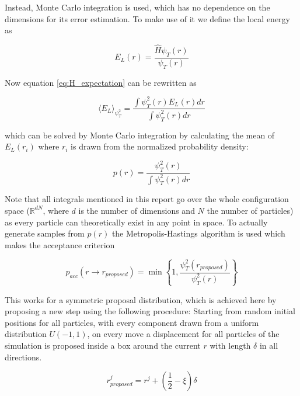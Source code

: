 \documentclass[a4paper, 11pt]{article}          %
\begin{document}
    Instead, Monte Carlo integration is used, which has no dependence on the dimensions for its error estimation. To make use of it we define the local energy as

    \begin{equation}\label{eq:local_energy}
        E_L(r) = \frac{\hat{H}\psi_T(r)}{\psi_T(r)}
    \end{equation}

    Now equation \eqref{eq:H_expectation} can be rewritten as

    \begin{equation}\label{eq:H_expectation_as_expectation_value}
        \langle E_L \rangle_{\psi_T^2} = \frac{\int \psi_T^2(r) E_L(r) dr}{\int \psi_T^2(r) dr}
    \end{equation}

    which can be solved by Monte Carlo integration by calculating the mean of $E_L(r_i)$ where $r_i$ is drawn from the normalized probability density:

    \begin{equation*}
        p(r) = \frac{\psi_T^2(r)}{\int \psi_T^2(r) dr}
    \end{equation*}

    Note that all integrals mentioned in this report go over the whole configuration space ($\mathbb{R}^{dN}$, where $d$ is the number of dimensions and $N$ the number of particles) as every particle can theoretically exist in any point in space. To actually generate samples from $p(r)$ the Metropolis-Hastings algorithm is used which makes the acceptance criterion

    \begin{equation*}
        p_{acc}(r \rightarrow r_{proposed}) = \min \left\{ 1, \frac{\psi_T^2(r_{proposed})}{\psi_T^2(r)} \right\}
    \end{equation*}

    This works for a symmetric proposal distribution, which is achieved here by proposing a new step using the following procedure: Starting from random initial positions for all particles, with every component drawn from a uniform distribution $U(-1,1)$, on every move a displacement for all particles of the simulation is proposed inside a box around the current $r$ with length $\delta$ in all directions.

    \begin{equation*}
        r_{proposed}^j = r^j+ (\frac{1}{2}-\xi)\delta
    \end{equation*}
\end{document}
